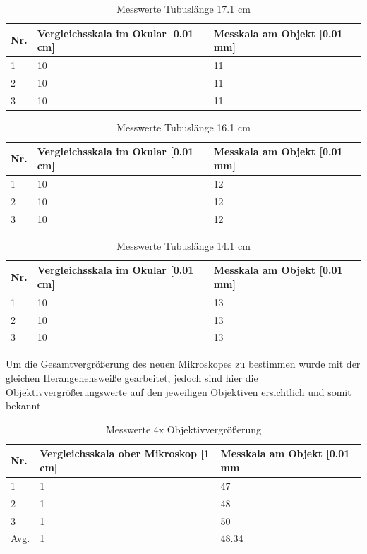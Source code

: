 \documentclass[12pt,a4paper,twoside]{article}
\begin{document}
\begin{table}[H]
    \centering
    \caption{Messwerte Tubuslänge 17.1 cm}
    \label{tab:10XmesswerteTB17}
    \begin{tabular}{| l | l | l |}
        \hline
        Nr.   & Vergleichsskala im Okular [0.01 cm]  & Messkala am Objekt [0.01 mm] \\
        \hline
        1 & 10 & 11 \\
        2 & 10 & 11 \\
        3 & 10 & 11 \\
        \hline
    \end{tabular}
\end{table}

\begin{table}[H]
    \centering
    \caption{Messwerte Tubuslänge 16.1 cm}
    \label{tab:10XmesswerteTB16}
    \begin{tabular}{| l | l | l |}
        \hline
        Nr.   & Vergleichsskala im Okular [0.01 cm]  & Messkala am Objekt [0.01 mm] \\
        \hline
        1 & 10 & 12 \\
        2 & 10 & 12 \\
        3 & 10 & 12 \\
        \hline
    \end{tabular}
\end{table}

\begin{table}[H]
    \centering
    \caption{Messwerte Tubuslänge 14.1 cm}
    \label{tab:10XmesswerteTB14}
    \begin{tabular}{| l | l | l |}
        \hline
        Nr.   & Vergleichsskala im Okular [0.01 cm]  & Messkala am Objekt [0.01 mm] \\
        \hline
        1 & 10 & 13 \\
        2 & 10 & 13 \\
        3 & 10 & 13 \\
        \hline
    \end{tabular}
\end{table}

\noindent
Um die Gesamtvergrößerung des neuen Mikroskopes zu bestimmen wurde mit der gleichen Herangehensweiße gearbeitet, jedoch sind hier die Objektivvergrößerungswerte auf den jeweiligen Objektiven ersichtlich und somit bekannt. 

\begin{table}[H]
    \centering
    \caption{Messwerte 4x Objektivvergrößerung}
    \label{tab:messwerteNM4x}
    \begin{tabular}{| l | l | l |}
        \hline
        Nr.   & Vergleichsskala ober Mikroskop [1 cm]  & Messkala am Objekt [0.01 mm] \\
        \hline
        1 & 1 & 47 \\
        2 & 1 & 48 \\
        3 & 1 & 50 \\
        \hline
        Avg. & 1 & 48.34 \\
        \hline
    \end{tabular}
\end{table}
\end{document}
